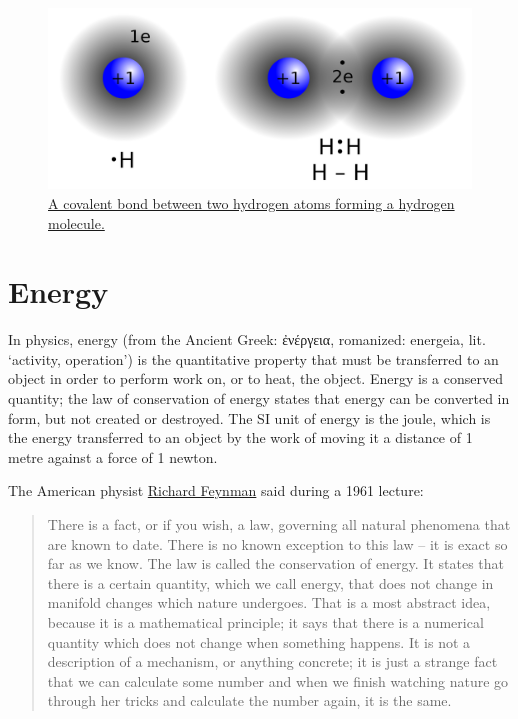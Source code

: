 \begin{figure}

{\centering \includegraphics[width=0.7\linewidth]{./figures/chemistry/Covalent_bond_hydrogen} 

}

\caption{\href{https://commons.wikimedia.org/wiki/File:Covalent_bond_hydrogen.svg}{A covalent bond between two hydrogen atoms forming a hydrogen molecule.}}\label{fig:covalentbond}
\end{figure}

\hypertarget{energy-1}{%
\section{Energy}\label{energy-1}}

In physics, energy (from the Ancient Greek: ἐνέργεια, romanized: energeia, lit. `activity, operation') is the quantitative property that must be transferred to an object in order to perform work on, or to heat, the object. Energy is a conserved quantity; the law of conservation of energy states that energy can be converted in form, but not created or destroyed. The SI unit of energy is the joule, which is the energy transferred to an object by the work of moving it a distance of 1 metre against a force of 1 newton.

The American physist \href{https://en.wikipedia.org/wiki/Richard_Feynman}{Richard Feynman} said during a 1961 lecture:

\begin{quote}
There is a fact, or if you wish, a law, governing all natural phenomena that are known to date. There is no known exception to this law -- it is exact so far as we know. The law is called the conservation of energy. It states that there is a certain quantity, which we call energy, that does not change in manifold changes which nature undergoes. That is a most abstract idea, because it is a mathematical principle; it says that there is a numerical quantity which does not change when something happens. It is not a description of a mechanism, or anything concrete; it is just a strange fact that we can calculate some number and when we finish watching nature go through her tricks and calculate the number again, it is the same.
\end{quote}

